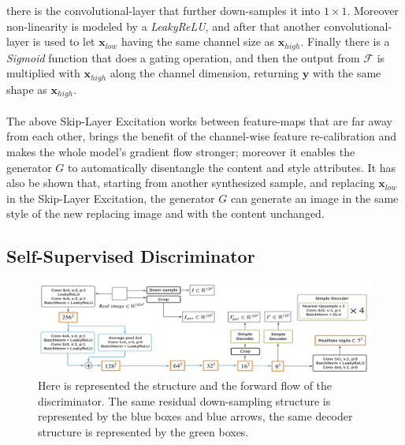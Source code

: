 \documentclass[12pt]{article}
\begin{document}
there is the convolutional-layer that further down-samples it into $1 \times 1$. Moreover non-linearity is modeled by a \textit{LeakyReLU},
and after that another convolutional-layer is used to let $\mathbf{x}_{low}$ having the same channel size as $\mathbf{x}_{high}$. 
Finally there is a \textit{Sigmoid} function that does a gating operation, and then the output from $\mathcal{F}$ is multiplied with 
$\mathbf{x}_{high}$ along the channel dimension, returning $\mathbf{y}$ with the same shape as $\mathbf{x}_{high}$.\\\\
The above Skip-Layer Excitation works between feature-maps that are far away from each other, brings the benefit of the channel-wise
feature re-calibration and makes the whole model’s gradient flow stronger; moreover it enables the generator $G$ to automatically 
disentangle the content and style attributes. It has also be shown that, starting from another synthesized sample, and replacing 
$\mathbf{x}_{low}$ in the Skip-Layer Excitation, the generator $G$ can generate an image in the same style of the new replacing 
image and with the content unchanged. 

\subsection{Self-Supervised Discriminator}

\begin{figure}[H]
	\label{fig:fig3}
	\includegraphics[width=1\textwidth]{Images/discriminator.png}
	\caption{
		Here is represented the structure and the forward flow of the discriminator.
		The same residual down-sampling structure is represented by the blue boxes and blue arrows,
		the same decoder structure is represented by the green boxes.
		}
\end{figure}
\end{document}
